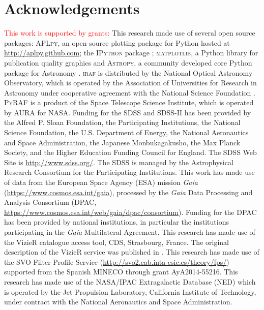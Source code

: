 \documentclass[apj, revtex4-1]{emulateapj}
\newcommand{\editorial}[1]{\textcolor{red}{#1}}
\begin{document}
\section*{Acknowledgements}
\editorial{This work is supported by grants:}
This research made use of several open source packages: \textsc{APLpy}, an open-source plotting package for Python hosted at \url{http://aplpy.github.com}; the \textsc{IPython} package \citep{Perez2007}; \textsc{matplotlib}, a Python library for publication quality graphics \citep{Hunter2007} and \textsc{Astropy}, a community developed core Python package for Astronomy \citep{TheAstropyCollaboration2013}.
\textsc{iraf} is distributed by the National Optical Astronomy Observatory, which is operated by the Association of Universities for Research in Astronomy under cooperative agreement with the National Science Foundation \citep{Tody1993}.
\textsc{PyRAF} is a product of the Space Telescope Science Institute, which is operated by AURA for NASA.
Funding for the SDSS and SDSS-II has been provided by the Alfred P. Sloan Foundation, the Participating Institutions, the National Science Foundation, the U.S. Department of Energy, the National Aeronautics and Space Administration, the Japanese Monbukagakusho, the Max Planck Society, and the Higher Education Funding Council for England. The SDSS Web Site is \url{http://www.sdss.org/}. The SDSS is managed by the Astrophysical Research Consortium for the Participating Institutions.
This work has made use of data from the European Space Agency (ESA) mission {\it Gaia} (\url{https://www.cosmos.esa.int/gaia}), processed by the {\it Gaia} Data Processing and Analysis Consortium (DPAC, \url{https://www.cosmos.esa.int/web/gaia/dpac/consortium}). Funding for the DPAC has been provided by national institutions, in particular the institutions participating in the {\it Gaia} Multilateral Agreement.
This research has made use of the VizieR catalogue access tool, CDS, Strasbourg, France. The original description of the VizieR service was published in \cite{Ochsenbein2000}.
This research has made use of the SVO Filter Profile Service (\url{http://svo2.cab.inta-csic.es/theory/fps/}) supported from the Spanish MINECO through grant AyA2014-55216.
This research has made use of the NASA/IPAC Extragalactic Database (NED) which is operated by the Jet Propulsion Laboratory, California Institute of Technology, under contract with the National Aeronautics and Space Administration. 




\end{document}
